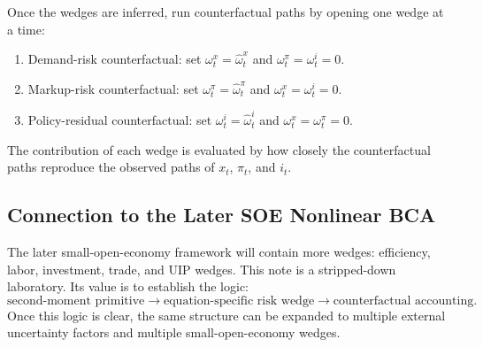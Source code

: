 Once the wedges are inferred, run counterfactual paths by opening one wedge at a
time:
\begin{enumerate}[label=(\alph*)]
    \item Demand-risk counterfactual: set
    \(\omega^x_t=\widehat{\omega}^x_t\) and
    \(\omega^\pi_t=\omega^i_t=0\).
    \item Markup-risk counterfactual: set
    \(\omega^\pi_t=\widehat{\omega}^\pi_t\) and
    \(\omega^x_t=\omega^i_t=0\).
    \item Policy-residual counterfactual: set
    \(\omega^i_t=\widehat{\omega}^i_t\) and
    \(\omega^x_t=\omega^\pi_t=0\).
\end{enumerate}
The contribution of each wedge is evaluated by how closely the counterfactual
paths reproduce the observed paths of \(x_t\), \(\pi_t\), and \(i_t\).

\subsection{Connection to the Later SOE Nonlinear BCA}

The later small-open-economy framework will contain more wedges: efficiency,
labor, investment, trade, and UIP wedges. This note is a stripped-down
laboratory. Its value is to establish the logic:
\[
    \text{second-moment primitive}
    \rightarrow
    \text{equation-specific risk wedge}
    \rightarrow
    \text{counterfactual accounting}.
\]
Once this logic is clear, the same structure can be expanded to multiple
external uncertainty factors and multiple small-open-economy wedges.
